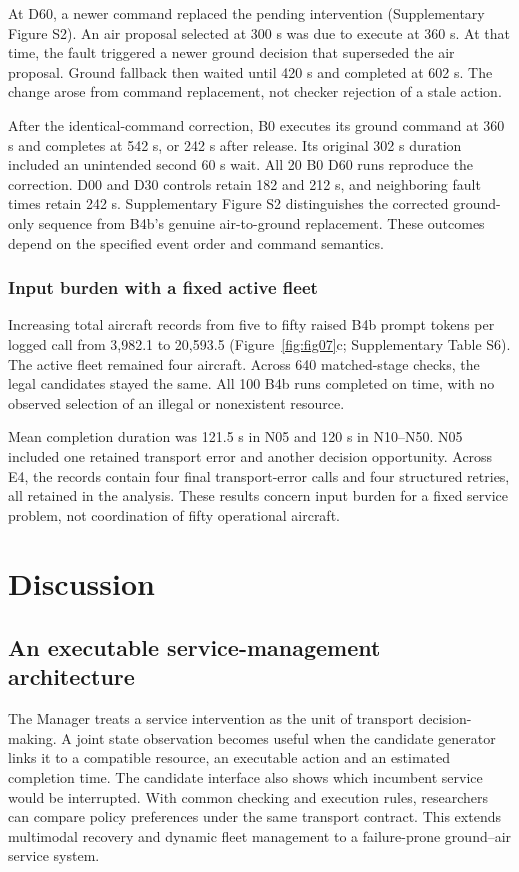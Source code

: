 \documentclass[]{interact}
\theoremstyle{plain}
\theoremstyle{definition}
\theoremstyle{remark}
\begin{document}
At D60, a newer command replaced the pending intervention (Supplementary Figure S2). An air proposal selected at 300 s was due to execute at 360 s. At that time, the fault triggered a newer ground decision that superseded the air proposal. Ground fallback then waited until 420 s and completed at 602 s. The change arose from command replacement, not checker rejection of a stale action.

After the identical-command correction, B0 executes its ground command at 360 s and completes at 542 s, or 242 s after release. Its original 302 s duration included an unintended second 60 s wait. All 20 B0 D60 runs reproduce the correction. D00 and D30 controls retain 182 and 212 s, and neighboring fault times retain 242 s. Supplementary Figure S2 distinguishes the corrected ground-only sequence from B4b's genuine air-to-ground replacement. These outcomes depend on the specified event order and command semantics.


\subsubsection{Input burden with a fixed active fleet}

Increasing total aircraft records from five to fifty raised B4b prompt tokens per logged call from 3,982.1 to 20,593.5 (Figure~\ref{fig:fig07}c; Supplementary Table S6). The active fleet remained four aircraft. Across 640 matched-stage checks, the legal candidates stayed the same. All 100 B4b runs completed on time, with no observed selection of an illegal or nonexistent resource.

Mean completion duration was 121.5 s in N05 and 120 s in N10--N50. N05 included one retained transport error and another decision opportunity. Across E4, the records contain four final transport-error calls and four structured retries, all retained in the analysis. These results concern input burden for a fixed service problem, not coordination of fifty operational aircraft.

\FloatBarrier
\section{Discussion}

\subsection{An executable service-management architecture}

The Manager treats a service intervention as the unit of transport decision-making. A joint state observation becomes useful when the candidate generator links it to a compatible resource, an executable action and an estimated completion time. The candidate interface also shows which incumbent service would be interrupted. With common checking and execution rules, researchers can compare policy preferences under the same transport contract. This extends multimodal recovery and dynamic fleet management to a failure-prone ground--air service system. \citep{ref4,ref20,ref22}
\end{document}
